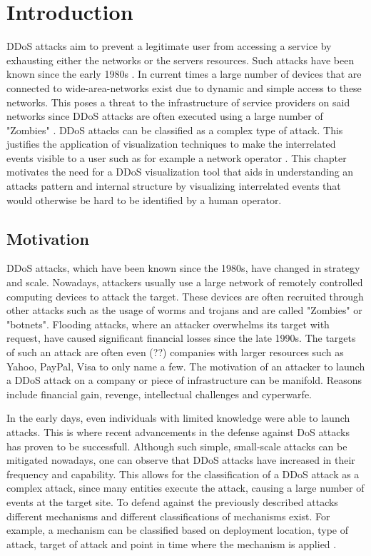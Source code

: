 \chapter{Introduction}
DDoS attacks aim to prevent a legitimate user from accessing a service by exhausting either the networks or the servers resources. Such attacks have been known since the early 1980s \cite{zargar}. In current times a large number of devices that are connected to wide-area-networks exist due to dynamic and simple access to these networks. This poses a threat to the infrastructure of service providers on said networks since DDoS attacks are often executed using a large number of "Zombies" \cite{zargar} \cite{kamboj}. DDoS attacks can be classified as a complex type of attack. This justifies the application of visualization techniques to make the interrelated events visible to a user such as for example a network operator \cite{yelizarov}.  This chapter motivates the need for a DDoS visualization tool that aids in understanding an attacks pattern and internal structure by visualizing interrelated events that would otherwise be hard to be identified by a human operator.

\section{Motivation}
DDoS attacks, which have been known since the 1980s, have changed in strategy and scale. Nowadays, attackers usually use a large network of remotely controlled computing devices to attack the target. These devices are often recruited through other attacks such as the usage of worms and trojans and are called "Zombies" or "botnets".
Flooding attacks, where an attacker overwhelms its target with request, have caused significant financial losses since the late 1990s. The targets of such an attack are often even (??) companies with larger resources such as Yahoo, PayPal, Visa to only name a few. The motivation of an attacker to launch a DDoS attack on a company or piece of infrastructure can be manifold. Reasons include financial gain, revenge, intellectual challenges and cyperwarfe.

In the early days, even individuals with limited knowledge were able to launch attacks. This is where recent advancements in the defense against DoS attacks has proven to be successfull. Although such simple, small-scale attacks can be mitigated nowadays, one can observe that DDoS attacks have increased in their frequency and capability\cite{zargar}.
This allows for the classification of a DDoS attack as a complex attack, since many entities execute the attack, causing a large number of events at the target site\cite{yelizarov}.
To defend against the previously described attacks different mechanisms and different classifications of mechanisms exist. For example, a mechanism can be classified based on deployment location, type of attack, target of attack and point in time where the mechanism is applied \cite{zargar}.

